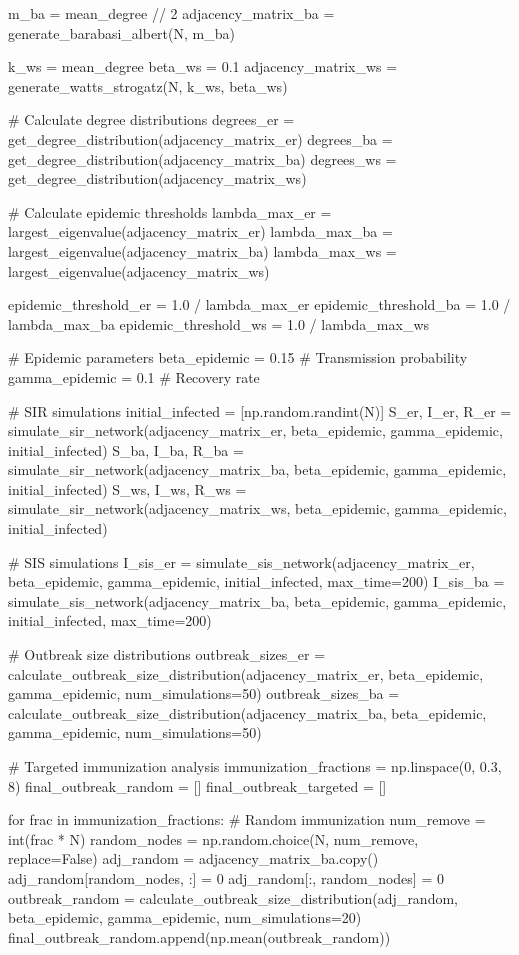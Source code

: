 \documentclass[a4paper, 11pt]{article}
\begin{document}
\begin{pycode}
m_ba = mean_degree // 2
adjacency_matrix_ba = generate_barabasi_albert(N, m_ba)

k_ws = mean_degree
beta_ws = 0.1
adjacency_matrix_ws = generate_watts_strogatz(N, k_ws, beta_ws)

# Calculate degree distributions
degrees_er = get_degree_distribution(adjacency_matrix_er)
degrees_ba = get_degree_distribution(adjacency_matrix_ba)
degrees_ws = get_degree_distribution(adjacency_matrix_ws)

# Calculate epidemic thresholds
lambda_max_er = largest_eigenvalue(adjacency_matrix_er)
lambda_max_ba = largest_eigenvalue(adjacency_matrix_ba)
lambda_max_ws = largest_eigenvalue(adjacency_matrix_ws)

epidemic_threshold_er = 1.0 / lambda_max_er
epidemic_threshold_ba = 1.0 / lambda_max_ba
epidemic_threshold_ws = 1.0 / lambda_max_ws

# Epidemic parameters
beta_epidemic = 0.15  # Transmission probability
gamma_epidemic = 0.1  # Recovery rate

# SIR simulations
initial_infected = [np.random.randint(N)]
S_er, I_er, R_er = simulate_sir_network(adjacency_matrix_er, beta_epidemic, gamma_epidemic, initial_infected)
S_ba, I_ba, R_ba = simulate_sir_network(adjacency_matrix_ba, beta_epidemic, gamma_epidemic, initial_infected)
S_ws, I_ws, R_ws = simulate_sir_network(adjacency_matrix_ws, beta_epidemic, gamma_epidemic, initial_infected)

# SIS simulations
I_sis_er = simulate_sis_network(adjacency_matrix_er, beta_epidemic, gamma_epidemic, initial_infected, max_time=200)
I_sis_ba = simulate_sis_network(adjacency_matrix_ba, beta_epidemic, gamma_epidemic, initial_infected, max_time=200)

# Outbreak size distributions
outbreak_sizes_er = calculate_outbreak_size_distribution(adjacency_matrix_er, beta_epidemic, gamma_epidemic, num_simulations=50)
outbreak_sizes_ba = calculate_outbreak_size_distribution(adjacency_matrix_ba, beta_epidemic, gamma_epidemic, num_simulations=50)

# Targeted immunization analysis
immunization_fractions = np.linspace(0, 0.3, 8)
final_outbreak_random = []
final_outbreak_targeted = []

for frac in immunization_fractions:
    # Random immunization
    num_remove = int(frac * N)
    random_nodes = np.random.choice(N, num_remove, replace=False)
    adj_random = adjacency_matrix_ba.copy()
    adj_random[random_nodes, :] = 0
    adj_random[:, random_nodes] = 0
    outbreak_random = calculate_outbreak_size_distribution(adj_random, beta_epidemic, gamma_epidemic, num_simulations=20)
    final_outbreak_random.append(np.mean(outbreak_random))


\end{pycode}
\end{document}
